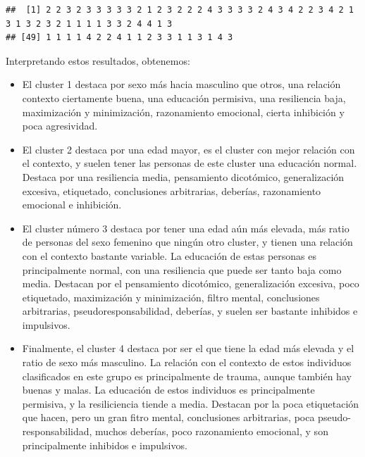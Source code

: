 \documentclass[]{article}
\newenvironment{Shaded}{\begin{snugshade}}{\end{snugshade}}
\newcommand{\OperatorTok}[1]{\textcolor[rgb]{0.81,0.36,0.00}{\textbf{#1}}}
\newcommand{\NormalTok}[1]{#1}
\begin{document}
\begin{Shaded}
\end{Shaded}

\begin{verbatim}
##  [1] 2 2 3 2 3 3 3 3 3 2 1 2 3 2 2 2 4 3 3 3 3 2 4 3 4 2 2 3 4 2 1 3 1 3 2 3 2 1 1 1 1 3 3 2 4 4 1 3
## [49] 1 1 1 1 4 2 2 4 1 1 2 3 3 1 1 3 1 4 3
\end{verbatim}

Interpretando estos resultados, obtenemos:

\begin{itemize}
\item
  El cluster 1 destaca por sexo más hacia masculino que otros, una
  relación contexto ciertamente buena, una educación permisiva, una
  resiliencia baja, maximización y minimización, razonamiento emocional,
  cierta inhibición y poca agresividad.
\item
  El cluster 2 destaca por una edad mayor, es el cluster con mejor
  relación con el contexto, y suelen tener las personas de este cluster
  una educación normal. Destaca por una resiliencia media, pensamiento
  dicotómico, generalización excesiva, etiquetado, conclusiones
  arbitrarias, deberías, razonamiento emocional e inhibición.
\item
  El cluster número 3 destaca por tener una edad aún más elevada, más
  ratio de personas del sexo femenino que ningún otro cluster, y tienen
  una relación con el contexto bastante variable. La educación de estas
  personas es principalmente normal, con una resiliencia que puede ser
  tanto baja como media. Destacan por el pensamiento dicotómico,
  generalización excesiva, poco etiquetado, maximización y minimización,
  filtro mental, conclusiones arbitrarias, pseudoresponsabilidad,
  deberías, y suelen ser bastante inhibidos e impulsivos.
\item
  Finalmente, el cluster 4 destaca por ser el que tiene la edad más
  elevada y el ratio de sexo más masculino. La relación con el contexto
  de estos individuos clasificados en este grupo es principalmente de
  trauma, aunque también hay buenas y malas. La educación de estos
  individuos es principalmente permisiva, y la resiliciencia tiende a
  media. Destacan por la poca etiquetación que hacen, pero un gran fitro
  mental, conclusiones arbitrarias, poca pseudo-responsabilidad, muchos
  deberías, poco razonamiento emocional, y son principalmente inhibidos
  e impulsivos.
\end{itemize}
\end{document}
